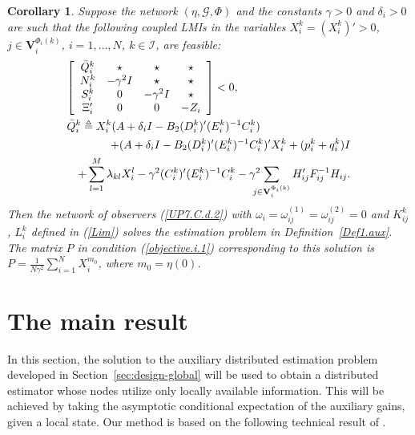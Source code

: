 \documentclass[a4paper,twocolumn]{autart}
\newtheorem{corollary}{Corollary}
\begin{document}
\begin{corollary}\label{Corollary}
Suppose the network $(\eta,\mathcal{G},\Phi)$ and the constants $\gamma>0$
and $\delta_i>0$ are such that the following coupled LMIs in the variables 
$X_i^k=(X_i^k)'>0$, $j\in \mathbf{V}_i^{\Phi_i(k)}$,  
$i=1,\ldots,N$, $k\in\mathcal{I}$, are feasible:
\begin{eqnarray}
\lefteqn{\left[
\begin{array}{cccc}
\bar Q_i^k & \star & \star & \star \\
N_i^k & -\gamma^2I & \star & \star \\
S_i^k & 0 & -\gamma^2 I & \star \\
\Xi_i' & 0  & 0 & -Z_i\\
\end{array}
\right]<0,} && \label{T4.LMI.Cor} 
\\
\lefteqn{\bar Q_i^k\triangleq
X_i^k(A+\delta_iI-B_2(D_i^k)'(E_i^k)^{-1}C_i^k)} && \nonumber \\
&&+(A+\delta_iI-
B_2(D_i^k)'(E_i^k)^{-1}C_i^k)'X_i^k  +(p_i^k+q_i^k)I \nonumber\\
&&
+\sum_{l=1}^M\lambda_{kl}X_i^l
-\gamma^2(C_i^k)'(E_i^k)^{-1}C_i^k- \gamma^2\hspace{-2ex}\sum_{j\in
  \mathbf{V}_i^{\Phi_i(k)}}H_{ij}'F_{ij}^{-1}H_{ij}. \nonumber
\end{eqnarray}
Then the network of observers (\ref{UP7.C.d.2}) with
$\omega_i=\omega_{ij}^{(1)}=\omega_{ij}^{(2)}=0$ and $K_{ij}^k$, $L_i^k$
defined in (\ref{Lim})
solves the estimation problem in Definition~\ref{Def1.aux}. The
matrix $P$ in condition (\ref{objective.i.1})
corresponding to this solution is $P=\frac{1}{N\gamma^2}\sum_{i=1}^NX_i^{m_0}$,
where $m_0=\eta(0)$.  
\end{corollary}


\section{The main result}\label{main}

In this section, the solution to the auxiliary distributed estimation
problem developed in Section~\ref{sec:design-global}  will be used to
obtain a distributed estimator whose nodes utilize only locally available 
information. This will be achieved by  
taking the asymptotic conditional expectation of the auxiliary gains, given 
a local state. 
Our method is based on the following
technical result of \cite{XiUP1}. 
\end{document}
